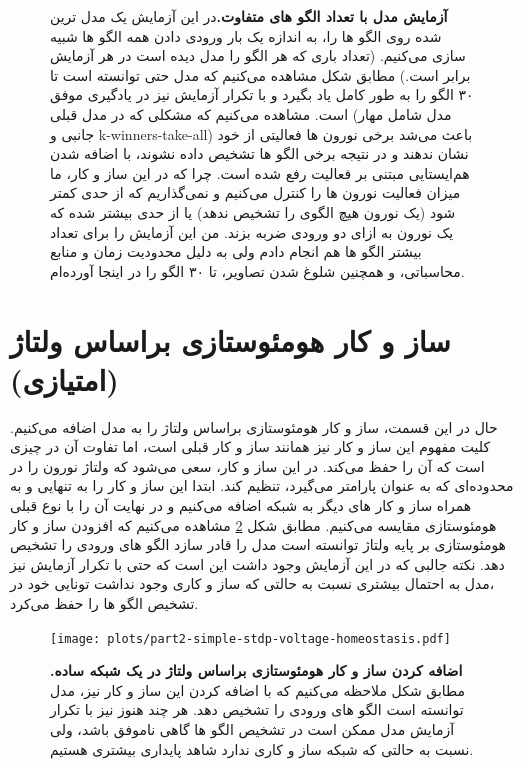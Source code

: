 \begin{figure}[!ht]
\begin{adjustbox}{minipage=\linewidth,scale=1}
            \end{adjustbox}
            \caption{\textbf{آزمایش مدل با تعداد الگو های متفاوت.}در این آزمایش یک مدل ترین شده روی الگو ها را، به اندازه یک بار ورودی دادن همه الگو ها شبیه سازی می‌کنیم. 
            (تعداد باری که هر الگو را مدل دیده است در هر آزمایش برابر است.) 
            مطابق شکل مشاهده می‌کنیم که مدل حتی توانسته است تا ۳۰ الگو را به طور کامل یاد بگیرد و با تکرار آزمایش نیز در یادگیری موفق است. مشاهده می‌کنیم که مشکلی که در مدل قبلی 
            (مدل شامل مهار جانبی و 
            k-winners-take-all) 
            باعث می‌شد برخی نورون ها فعالیتی از خود نشان ندهند و در نتیجه برخی الگو ها تشخیص داده نشوند، با اضافه شدن هم‌ایستایی مبتنی بر فعالیت رفع شده است. چرا که در این ساز و کار، ما میزان فعالیت نورون ها را کنترل می‌کنیم و نمی‌گذاریم که از حدی کمتر شود 
            (یک نورون هیچ الگوی را تشخیص ندهد) 
            یا از حدی بیشتر شده که یک نورون به ازای دو ورودی ضربه بزند.
            من این آزمایش را برای تعداد بیشتر الگو ها هم انجام دادم ولی به دلیل محدودیت زمان و منابع محاسباتی، و همچنین شلوغ شدن تصاویر، تا ۳۰ الگو را در اینجا آورده‌‌ام.}
            \label{fig:part1-evaluation-simple-stdp-LI-KWTA}
        \end{figure}




\clearpage
\section{ساز و کار هومئوستازی براساس ولتاژ (امتیازی)}
        حال در این قسمت، ساز و کار هومئوستازی براساس ولتاژ را به مدل اضافه می‌کنیم. کلیت مفهوم این ساز و کار نیز همانند ساز و کار قبلی است، اما تفاوت آن در چیزی است که آن را حفظ می‌کند. در این ساز و کار، سعی می‌شود که ولتاژ نورون را در محدوده‌ای که به عنوان پارامتر می‌گیرد، تنظیم کند. ابتدا این ساز و کار را به تنهایی و به همراه ساز و کار های دیگر به شبکه اضافه می‌کنیم و در نهایت آن را با نوع قبلی هومئوستازی مقایسه می‌کنیم. مطابق شکل 
        \ref{fig:part2-simple-stdp-voltage-homeostasis} 
        مشاهده می‌کنیم که افزودن ساز و کار هومئوستازی بر پایه ولتاژ توانسته است مدل را قادر سازد الگو های ورودی را تشخیص دهد. نکته جالبی که در این آزمایش وجود داشت این است که حتی با تکرار آزمایش نیز ،مدل به احتمال بیشتری نسبت به حالتی که ساز و کاری وجود نداشت تونایی خود در تشخیص الگو ها را حفظ می‌کرد.

        \begin{figure}[!ht]
            \centering
            \texttt{[image: plots/part2-simple-stdp-voltage-homeostasis.pdf]} 
            \captionsetup{width=.9\linewidth}
            \caption{\textbf{ اضافه کردن ساز و کار
            هومئوستازی براساس ولتاژ در یک شبکه ساده.} مطابق شکل ملاحظه می‌کنیم که با اضافه کردن این ساز و کار نیز، مدل توانسته است الگو های ورودی را تشخیص دهد. هر چند هنوز نیز با تکرار آزمایش مدل ممکن است در تشخیص الگو ها گاهی ناموفق باشد، ولی نسبت به حالتی که شبکه ساز و کاری ندارد شاهد پایداری بیشتری هستیم.}
            \label{fig:part2-simple-stdp-voltage-homeostasis}
        \end{figure}

